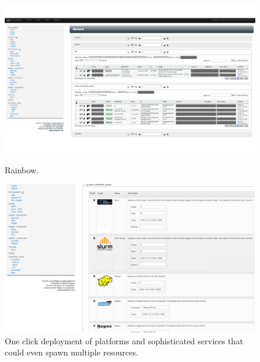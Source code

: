 \begin{figure}[htb]
  \centering
    \includegraphics[width=.9\textwidth]{images/instances.pdf}
  \caption{Rainbow.}\label{F:instances}
  \centering
    \includegraphics[width=.9\textwidth]{images/oneclick.pdf}
  \caption{One click deployment of platforms and sophisticated
    services that could even spawn multiple resources.}\label{F:oneclick}
\end{figure}


\afterpage{\clearpage}